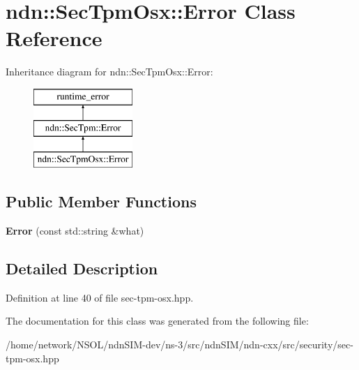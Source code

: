 \hypertarget{classndn_1_1SecTpmOsx_1_1Error}{}\section{ndn\+:\+:Sec\+Tpm\+Osx\+:\+:Error Class Reference}
\label{classndn_1_1SecTpmOsx_1_1Error}
Inheritance diagram for ndn\+:\+:Sec\+Tpm\+Osx\+:\+:Error\+:\begin{figure}[H]
\begin{center}
\leavevmode
\includegraphics[height=3.000000cm]{classndn_1_1SecTpmOsx_1_1Error}
\end{center}
\end{figure}
\subsection*{Public Member Functions}
\begin{DoxyCompactItemize}
\item 
{\bfseries Error} (const std\+::string \&what)\hypertarget{classndn_1_1SecTpmOsx_1_1Error_a3e7176cf9ec87642734675cfe372f415}{}\label{classndn_1_1SecTpmOsx_1_1Error_a3e7176cf9ec87642734675cfe372f415}

\end{DoxyCompactItemize}


\subsection{Detailed Description}


Definition at line 40 of file sec-\/tpm-\/osx.\+hpp.



The documentation for this class was generated from the following file\+:\begin{DoxyCompactItemize}
\item 
/home/network/\+N\+S\+O\+L/ndn\+S\+I\+M-\/dev/ns-\/3/src/ndn\+S\+I\+M/ndn-\/cxx/src/security/sec-\/tpm-\/osx.\+hpp\end{DoxyCompactItemize}
